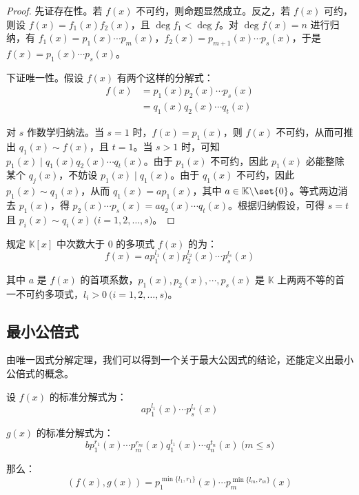 \begin{proof}
	先证存在性。若 $f(x)$ 不可约，则命题显然成立。反之，若 $f(x)$ 可约，则设 $f(x) = f_1(x) f_2(x)$，且 $\deg f_1 < \deg f$。对 $\deg f(x) = n$ 进行归纳，有 $f_1(x) = p_1(x) \cdots p_m(x)$，$f_2(x) = p_{m + 1}(x) \cdots p_s(x)$，于是 $f(x) = p_1(x) \cdots p_s(x)$。

	\bigskip

	下证唯一性。假设 $f(x)$ 有两个这样的分解式：
	$$
	\begin{aligned}
		f(x) &= p_1(x) p_2(x) \cdots p_s(x)
		\\&=
		q_1(x) q_2(x) \cdots q_t(x)
	\end{aligned}
	$$

	对 $s$ 作数学归纳法。当 $s = 1$ 时，$f(x) = p_1(x)$，则 $f(x)$ 不可约，从而可推出 $q_1(x) \sim f(x)$，且 $t = 1$。当 $s > 1$ 时，可知 $p_1(x) \mid q_1(x) q_2(x) \cdots q_t(x)$。由于 $p_1(x)$ 不可约，因此 $p_1(x)$ 必能整除某个 $q_j(x)$，不妨设 $p_1(x) \mid q_1(x)$。由于 $q_1(x)$ 不可约，因此 $p_1(x) \sim q_1(x)$，从而 $q_1(x) = a p_1(x)$，其中 $a \in \mathbb K \backslash \set{0}$。等式两边消去 $p_1(x)$，得 $p_2(x) \cdots p_s(x) = a q_2(x) \cdots q_t(x)$。根据归纳假设，可得 $s = t$ 且 $p_i(x) \sim q_i(x) \pod{i = 1, 2, \ldots, s}$。
\end{proof}

规定 $\mathbb K[x]$ 中次数大于 $0$ 的多项式 $f(x)$ 的\emph{}为：
$$
f(x) = a p_1^{l_1}(x) p_2^{l_2}(x) \cdots p_s^{l_s}(x)
$$

其中 $a$ 是 $f(x)$ 的首项系数，$p_1(x), p_2(x), \cdots, p_s(x)$ 是 $\mathbb K$ 上两两不等的首一不可约多项式，$l_i > 0 \pod{i = 1, 2, \ldots, s}$。

\subsection{最小公倍式}

由唯一因式分解定理，我们可以得到一个关于最大公因式的结论，还能定义出最小公倍式的概念。

\begin{proposition}
	设 $f(x)$ 的标准分解式为：
	$$
	a p_1^{l_1}(x) \cdots p_s^{l_s}(x)
	$$

	$g(x)$ 的标准分解式为：
	$$
	b p_1^{r_1}(x) \cdots p_m^{r_m}(x) q_1^{t_1}(x) \cdots q_n^{t_n}(x) \pod{m \le s}
	$$

	那么：
	$$
	(f(x), g(x)) = p_1^{\min\{ l_1, r_1 \}}(x) \cdots p_m^{\min\{ l_m, r_m \}}(x)
	$$
\end{proposition}

